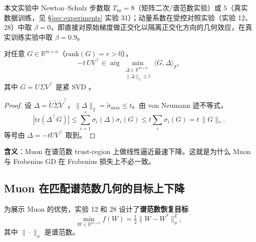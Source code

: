 \noindent 本文实验中 Newton--Schulz 步数取 $T_{\mathrm{ns}}=8$（矩阵二次/谱范数实验）或 $5$（真实数据训练，见 \S\ref{sec:experiments} 实验 31）；动量系数在受控对照实验（实验 12、28）中取 $\beta=0$，即直接对原始梯度做正交化以隔离正交化方向的几何效应，在真实训练实验中取 $\beta=0.9$。

\begin{theorem}
\label{thm:muon-tr}
对任意 $G \in \mathbb{R}^{m\times n}$（$\mathrm{rank}(G) = r > 0$），
\[
  -t\,U V^\top \in \arg\min_{\substack{\Delta \in \mathbb{R}^{m\times n}\\ \|\Delta\|_2 \le t}} \langle G, \Delta\rangle_F,
\]
其中 $G = U \Sigma V^\top$ 是紧 SVD \cite{kovalev2025}。
\end{theorem}

\begin{proof}
设 $\Delta = \widetilde U \widetilde\Sigma \widetilde V^\top$，$\|\Delta\|_2 = \widetilde\sigma_{\max} \le t$。由 von Neumann 迹不等式，
\[
  |\mathrm{tr}(\Delta^\top G)| \le \sum_{i=1}^{r} \sigma_i(\Delta) \sigma_i(G) \le t \sum_i \sigma_i(G) = t\,\|G\|_*.
\]
等号由 $\Delta = -t U V^\top$ 取到。
\end{proof}

\textbf{含义}：Muon 在谱范数 trust-region 上做线性逼近最速下降。这就是为什么 Muon 与 Frobenius GD 在 Frobenius 损失上不必一致。

\subsection{Muon 在匹配谱范数几何的目标上下降}

为展示 Muon 的优势，实验 12 和 28 设计了\textbf{谱范数恢复目标}
\[
  \min_{W \in \mathbb{R}^{m\times n}} f(W) = \tfrac{1}{2} \|W - W^*\|_\sigma^2,
\]
其中 $\|\cdot\|_\sigma$ 是谱范数。

